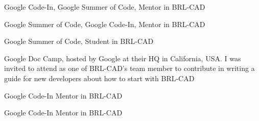     {Google Code-In,}
    {Google Summer of Code,}
    {}
    {Mentor in BRL-CAD}
    {}
    {}

    {Google Summer of Code,}
    {Google Code-In,}
    {}
    {Mentor in BRL-CAD}
    {}
    {}

    {Google Summer of Code,}
    {}
    {Student in BRL-CAD}
    {}
    {}

    {Google Doc Camp,}
    {}
    {hosted by Google at their HQ in California, USA. I was invited to attend as one of BRL-CAD's team member to contribute in writing a guide for new developers about how to start with BRL-CAD}
    {}
    {}

    {Google Code-In}
    {}
    {Mentor in BRL-CAD}
    {}
    {}

    {Google Code-In}
    {}
    {Mentor in BRL-CAD}
    {}
    {}
